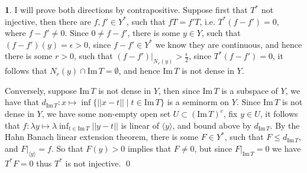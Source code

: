 \documentclass[10.5pt]{article}
\theoremstyle{definition}
\newtheorem{pb}{}
\newcommand{\set}[1]{\{#1\}}
\newcommand{\norm}[1]{\lvert\lvert#1\rvert\rvert}
\newcommand{\im}{\text{Im}}
\newcommand{\gen}[1]{\langle #1 \rangle}
\begin{document}
    \begin{pb}
        I will prove both directions by contrapositive. Suppose first that \(T^*\) not injective, then there are \(f,f' \in Y^*\), such that \(fT = f'T\), i.e. \(T^*(f - f') = 0\), where \(f-f' \neq 0\). Since \(0 \neq f - f'\), there is some \(y \in Y\), such that \((f - f')(y) = \epsilon > 0\), since \(f-f' \in Y^*\) we know they are continuous, and hence there is some \(r>0\), such that \((f-f')\vert_{N_r(y)} > \frac{\epsilon}{2}\), since \(T^*(f-f') = 0\), it follows that \(N_r(y) \cap \im\, T = \emptyset\), and hence \(\im\,T\) is not dense in \(Y\).

        Conversely, suppose \(\im\, T\) is not dense in \(Y\), then since \(\im\,T\) is a subspace of \(Y\), we have that \(d_{\im\,T}:x \mapsto \inf\set{\norm{x-t}\mid t \in \im\,T}\) is a seminorm on \(Y\). Since \(\im\,T\) is not dense in \(Y\), we have some non-empty open set \(U \subset (\im\,T)^c\), fix \(y \in U\), it follows that \(f: \lambda y\mapsto \lambda\inf_{t \in \im\,T}\norm{y - t}\) is linear of \(\gen{y}\), and bound above by \(d_{\im\,T}\). By the Hahn Banach linear extension theorem, there is some \(F \in Y^*\), such that \(F \leq d_{\im\,T}\), and \(F\vert_{\gen{y}} = f\). So that \(F(y) > 0\) implies that \(F \neq 0\), but since \(F\vert_{\im\,T} = 0\) we have \(T^*F = 0\) thus \(T^*\) is not injective. \qed
    \end{pb}
\end{document}

